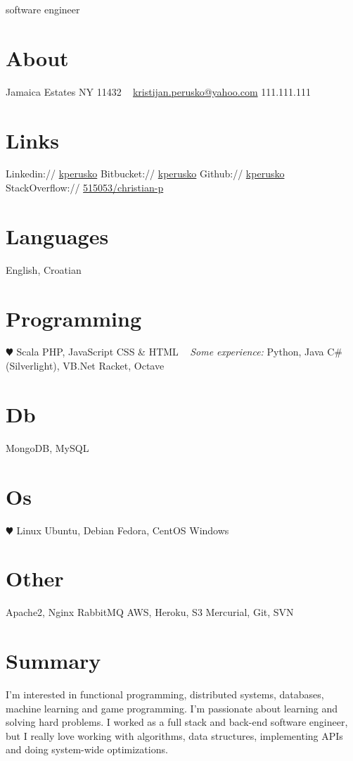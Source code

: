 \documentclass[print]{friggeri-cv}
\begin{document}
       {software engineer}


\begin{aside}
  \section{About}
    Jamaica Estates
    NY 11432
~
    \href{mailto:kristijan.perusko@yahoo.com}{kristijan.perusko@yahoo.com}
    111.111.111
  \section{Links}  
    Linkedin://  \href{https://www.linkedin.com/in/kperusko}{kperusko}
    Bitbucket:// \href{https://bitbucket.org/kperusko}{kperusko}    
    Github:// \href{https://github.com/kperusko}{kperusko}
    StackOverflow:// \href{http://stackoverflow.com/users/515053/christian-p}{515053/christian-p}
  \section{Languages}
    English, Croatian
  \section{Programming}
    {\color{red} $\varheartsuit$} Scala
    PHP, JavaScript
    CSS \& HTML
~     
    \emph{Some experience:}
    Python, Java
    C\# (Silverlight), VB.Net
    Racket, Octave
  \section{Db}
    MongoDB, MySQL
  \section{Os}
    {\color{red} $\varheartsuit$} Linux 
    Ubuntu, Debian 
    Fedora, CentOS
    Windows
  \section{Other}
    Apache2, Nginx
    RabbitMQ
    AWS, Heroku, S3
    Mercurial, Git, SVN
\end{aside}

\section{Summary}

I’m interested in functional programming, distributed systems, databases, machine learning and game programming. I'm passionate about learning and solving hard problems. I worked as a full stack and back-end software engineer, but I really love working with algorithms, data structures, implementing APIs and doing system-wide optimizations.
\end{document}
